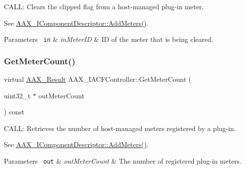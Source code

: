 C\+A\+LL\+: Clears the clipped flag from a host-\/managed plug-\/in meter. 

See \mbox{\hyperlink{a01781_a5e4a61afa3d6510891e16d7179bdaa64}{A\+A\+X\+\_\+\+I\+Component\+Descriptor\+::\+Add\+Meters()}}.


\begin{DoxyParams}[1]{Parameters}
\mbox{\texttt{ in}}  & {\em in\+Meter\+ID} & ID of the meter that is being cleared. \\
\hline
\end{DoxyParams}
\mbox{\label{a01637_aaf316786f9f280cd5711848eeeec3d99}} 
\subsubsection{\texorpdfstring{GetMeterCount()}{GetMeterCount()}}
{\footnotesize\ttfamily virtual \mbox{\hyperlink{a00392_a4d8f69a697df7f70c3a8e9b8ee130d2f}{A\+A\+X\+\_\+\+Result}} A\+A\+X\+\_\+\+I\+A\+C\+F\+Controller\+::\+Get\+Meter\+Count (\begin{DoxyParamCaption}\item[{uint32\+\_\+t $\ast$}]{out\+Meter\+Count }\end{DoxyParamCaption}) const\hspace{0.3cm}{\ttfamily [pure virtual]}}



C\+A\+LL\+: Retrieves the number of host-\/managed meters registered by a plug-\/in. 

See \mbox{\hyperlink{a01781_a5e4a61afa3d6510891e16d7179bdaa64}{A\+A\+X\+\_\+\+I\+Component\+Descriptor\+::\+Add\+Meters()}}.


\begin{DoxyParams}[1]{Parameters}
\mbox{\texttt{ out}}  & {\em out\+Meter\+Count} & The number of registered plug-\/in meters. \\
\hline
\end{DoxyParams}
\mbox{\label{a01637_a6a5c0cdfbe314476bdfd15caaee8d010}} 
